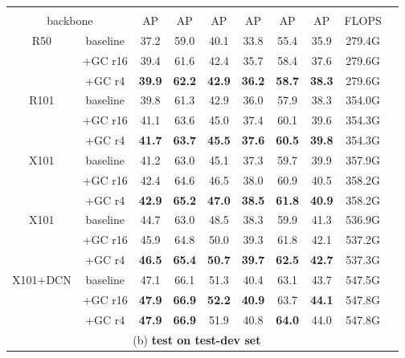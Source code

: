 \documentclass[10pt,twocolumn,letterpaper]{article}
\begin{document}
\begin{table}[t]
    \footnotesize
    \centering
    \addtolength{\tabcolsep}{-5.5pt}
    \begin{tabular}[t]{cc|ccc|ccc|cc}
    \Xhline{1.0pt}
\multicolumn{9}{c}{(a) \textbf{test on validation set}}                            \\
     \multicolumn{2}{c|}{\centering backbone} &
     AP & AP & AP &
     AP & AP & AP &
     FLOPS \\
    \hline
    \multirow{3}{*}{R50}              & baseline & 37.2 & 59.0 & 40.1 & 33.8 & 55.4 & 35.9 & 279.4G  \\
                                      & +GC r16 & 39.4 & 61.6 & 42.4 & 35.7 & 58.4 & 37.6 &  279.6G \\
                                      & +GC r4& \textbf{39.9} & \textbf{62.2} & \textbf{42.9} & \textbf{36.2} & \textbf{58.7} & \textbf{38.3} & 279.6G \\
    \hline
    \multirow{3}{*}{R101}             & baseline & 39.8 & 61.3 & 42.9 & 36.0 & 57.9 & 38.3 & 354.0G \\
                                      & +GC r16 & 41.1 & 63.6 & 45.0 & 37.4 & 60.1 & 39.6 & 354.3G \\
                                      & +GC r4 & \textbf{41.7} & \textbf{63.7} & \textbf{45.5} & \textbf{37.6} & \textbf{60.5} & \textbf{39.8} & 354.3G \\
    \hline
    \multirow{3}{*}{X101}             & baseline & 41.2 & 63.0 & 45.1 & 37.3 & 59.7 & 39.9 & 357.9G \\
                                      & +GC r16 & 42.4 & 64.6 & 46.5 & 38.0 & 60.9 & 40.5 & 358.2G \\
                                      & +GC r4 & \textbf{42.9} & \textbf{65.2} & \textbf{47.0} & \textbf{38.5} & \textbf{61.8} & \textbf{40.9} & 358.2G \\
    \hline
    \multirow{2}{*}{X101}             & baseline & 44.7 & 63.0 & 48.5 & 38.3 & 59.9 & 41.3 & 536.9G \\
    \multirow{2}{*}{+Cascade}         & +GC r16 & 45.9 & 64.8 & 50.0 & 39.3 & 61.8 & 42.1 & 537.2G \\
                                      & +GC r4 & \textbf{46.5} & \textbf{65.4} & \textbf{50.7} & \textbf{39.7} & \textbf{62.5} & \textbf{42.7} & 537.3G \\

    \hline
    \multirow{2}{*}{X101+DCN}         & baseline & 47.1 & 66.1 & 51.3 & 40.4 & 63.1 & 43.7 & 547.5G \\
    \multirow{2}{*}{+Cascade}         & +GC r16 & \textbf{47.9} & \textbf{66.9} & \textbf{52.2} & \textbf{40.9} & 63.7 & \textbf{44.1} & 547.8G \\
                                      & +GC r4 & \textbf{47.9} & \textbf{66.9} & 51.9 & 40.8 & \textbf{64.0} & 44.0 & 547.8G \\
\hline
\multicolumn{9}{c}{(b) \textbf{test on test-dev set}}  \\
    \hline
    

\end{tabular}
\end{table}
\end{document}
